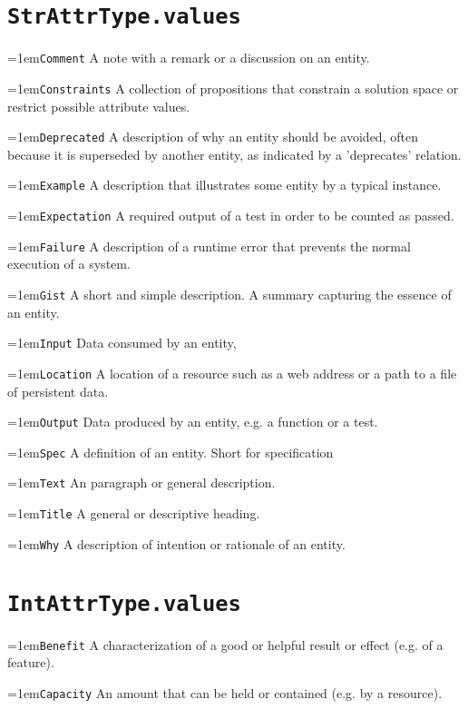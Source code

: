 \documentclass[a4paper,oneside]{article}
\newcommand\Concept[2]{\hangindent=1em\lstinline+#1+ #2}
\begin{document}
\begin{multicols*}{4}
\raggedright


\section*{\texttt{StrAttrType.values}}
\Concept{Comment}{A note with a remark or a discussion on an entity.}

\Concept{Constraints}{A collection of propositions that constrain a solution space or restrict possible attribute values.}

\Concept{Deprecated}{A description of why an entity should be avoided, often because it is superseded by another entity, as indicated by a 'deprecates' relation.}

\Concept{Example}{A description that illustrates some entity by a typical instance.}

\Concept{Expectation}{A required output of a test in order to be counted as passed.}

\Concept{Failure}{A description of a runtime error that prevents the normal execution of a system.}

\Concept{Gist}{A short and simple description. A summary capturing the essence of an entity.}

\Concept{Input}{Data consumed by an entity, }

\Concept{Location}{A location of a resource such as a web address or a path to a file of persistent data.}

\Concept{Output}{Data produced by an entity, e.g. a function or a test.}

\Concept{Spec}{A definition of an entity. Short for specification}

\Concept{Text}{An paragraph or general description.}

\Concept{Title}{A general or descriptive heading.}

\Concept{Why}{A description of intention or rationale of an entity.}

\section*{\texttt{IntAttrType.values}}
\Concept{Benefit}{A characterization of a good or helpful result or effect (e.g. of a feature).}

\Concept{Capacity}{An amount that can be held or contained (e.g. by a resource).}


\end{multicols*}
\end{document}
